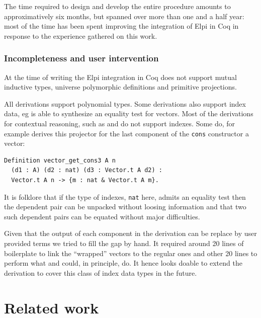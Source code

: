 \documentclass[sigplan,10pt,review]{acmart}\settopmatter{printfolios=true,printccs=false,printacmref=false}
\newcommand{\derive}[1]{\keys{#1}}
\begin{document}
The time required to design and develop the entire procedure amounts
to approximatively six months, but spanned over more than one and a
half year: most of the time has been spent improving the integration
of Elpi in Coq in response to the experience gathered on this work.

\subsubsection{Incompleteness and user intervention} %
\label{sec:oops}

At the time of writing the Elpi integration in Coq does not support
mutual inductive types, universe polymorphic definitions and primitive
projections.

All derivations support polynomial types.
Some derivations also support index data, eg \derive{eq} is able to
synthesize an equality test for vectors. Most of the derivations for
contextual reasoning, such as \derive{eqK} and \derive{bcongr} do not
support indexes.
Some do, for example \derive{projK} derives
this projector for the last component of the \lstinline+cons+
constructor a vector:

\begin{minipage}{\textwidth}\begin{lstlisting}
Definition vector_get_cons3 A n
  (d1 : A) (d2 : nat) (d3 : Vector.t A d2) :
  Vector.t A n -> {m : nat & Vector.t A m}.
\end{lstlisting}\end{minipage}

\noindent
It is folklore that if the type of indexes, \lstinline+nat+ here,
admits an equality test then the dependent pair can be unpacked
without loosing information and that two such dependent pairs can be
equated without major difficulties.

Given that the output of each component in the derivation can
be replace by user provided terms we tried to fill the gap by
hand. It required around 20 lines of boilerplate to link the
``wrapped'' vectors to the regular ones and other 20 lines to
perform what \derive{bcongr} and \derive{eqK} could, in principle, do.
It hence looks doable to extend the derivation to cover this class of
index data types in the future.

\section{Related work} %
\label{sec:related}
\end{document}
